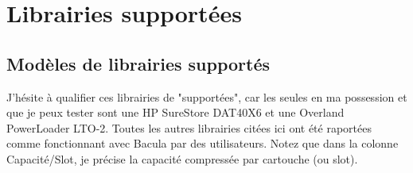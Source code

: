 
\chapter{Librairies support\'ees}
\label{_ChapterStart21}

\section{Mod\`eles de librairies support\'es}
\label{Models}

J'h\'esite \`a qualifier ces librairies de "support\'ees", car les seules 
en ma possession et que je peux tester sont une HP SureStore DAT40X6 et 
une Overland PowerLoader LTO-2. Toutes les autres librairies cit\'ees ici 
ont \'et\'e raport\'ees comme fonctionnant avec Bacula par des utilisateurs. 
Notez que dans la colonne Capacit\'e/Slot, je pr\'ecise la capacit\'e compress\'ee 
par cartouche (ou slot).


